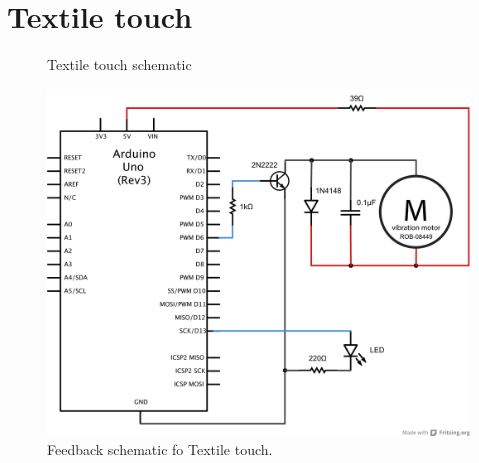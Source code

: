 \section{Textile touch}
\label{app:textile-touch}

\begin{landscape}
	\thispagestyle{empty}
	\centering
	\begin{figure}[p]
	    \caption{Textile touch schematic}
	\end{figure}
\end{landscape}

\begin{figure}[h]
	\centering
  		\includegraphics[width=\textwidth]{figures/schematics/textile-touch-feedback.pdf}
	\caption{Feedback schematic fo Textile touch.}
\end{figure}